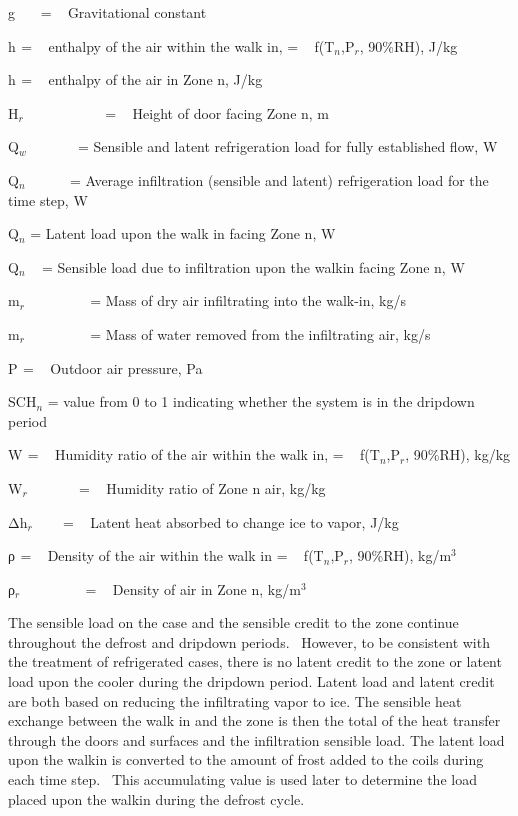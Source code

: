 g~~~ = ~ Gravitational constant

h\(_{ }\) = ~ enthalpy of the air within the walk in, = ~ f(T\(_{n}\),P\(_{r}\), 90\%RH), J/kg

h\(_{ }\) = ~ enthalpy of the air in Zone n, J/kg

H\(_{r}\)~~~~~~~~~~~ = ~ Height of door facing Zone n, m

Q\(_{w}\) ~~~~~~ = Sensible and latent refrigeration load for fully established flow, W

Q\(_{n}\) ~~~~~ = Average infiltration (sensible and latent) refrigeration load for the time step, W

Q\(_{n}\) = Latent load upon the walk in facing Zone n, W

Q\(_{n}\) ~ = Sensible load due to infiltration upon the walkin facing Zone n, W

m\(_{r}\) ~~~~~~~~ = Mass of dry air infiltrating into the walk-in, kg/s

m\(_{r}\) ~~~~~~~~ = Mass of water removed from the infiltrating air, kg/s

P\(_{ }\) = ~ Outdoor air pressure, Pa

SCH\(_{n}\) = value from 0 to 1 indicating whether the system is in the dripdown period

W\(_{ }\) = ~ Humidity ratio of the air within the walk in, = ~ f(T\(_{n}\),P\(_{r}\), 90\%RH), kg/kg

W\(_{r}\) ~~~~~~ = ~ Humidity ratio of Zone n air, kg/kg

Δh\(_{r}\) ~~~ = ~ Latent heat absorbed to change ice to vapor, J/kg

ρ\(_{ }\) = ~ Density of the air within the walk in = ~ f(T\(_{n}\),P\(_{r}\), 90\%RH), kg/m\(^{3}\)

ρ\(_{r}\) ~~~~~~~~ = ~ Density of air in Zone n, kg/m\(^{3}\)

The sensible load on the case and the sensible credit to the zone continue throughout the defrost and dripdown periods.~ However, to be consistent with the treatment of refrigerated cases, there is no latent credit to the zone or latent load upon the cooler during the dripdown period. Latent load and latent credit are both based on reducing the infiltrating vapor to ice. The sensible heat exchange between the walk in and the zone is then the total of the heat transfer through the doors and surfaces and the infiltration sensible load. The latent load upon the walkin is converted to the amount of frost added to the coils during each time step.~ This accumulating value is used later to determine the load placed upon the walkin during the defrost cycle.


